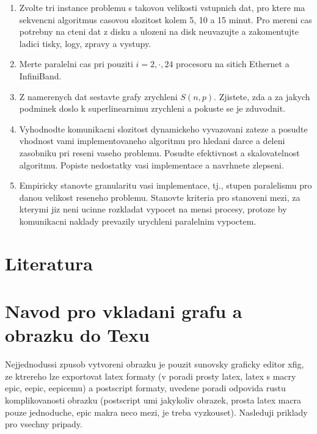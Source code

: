 \documentclass[a4paper]{article}
\begin{document}
\begin{enumerate}
\item Zvolte tri instance problemu s takovou velikosti vstupnich dat, pro ktere ma sekvencni 
algoritmus casovou slozitost kolem 5, 10 a 15 minut.
Pro mereni cas potrebny na cteni dat z disku a ulozeni na disk neuvazujte a zakomentujte
ladici tisky, logy, zpravy a vystupy.
\item Merte paralelni cas pri pouziti $i=2,\cdot,24$ procesoru na sitich Ethernet a InfiniBand.
\item Z namerenych dat sestavte grafy zrychleni $S(n,p)$. Zjistete, zda a za jakych podminek
doslo k superlinearnimu zrychleni a pokuste se je zduvodnit.
\item Vyhodnodte komunikacni slozitost dynamickeho vyvazovani zateze a posudte
vhodnost vami implementovaneho algoritmu pro hledani darce a deleni zasobniku pri reseni vaseho
problemu. Posudte efektivnost a skalovatelnost algoritmu. Popiste nedostatky
vasi implementace a navrhnete zlepseni.
\item Empiricky stanovte 
granularitu vasi implementace, tj., stupen paralelismu pro danou velikost reseneho
problemu. Stanovte kriteria pro stanoveni mezi, za kterymi jiz neni
ucinne rozkladat vypocet na mensi procesy, protoze by komunikacni
naklady prevazily urychleni paralelnim vypoctem.

\end{enumerate}

\section{Literatura}

\appendix

\section{Navod pro vkladani grafu a obrazku do Texu}

Nejjednodussi zpusob vytvoreni obrazku je pouzit sunovsky graficky editor xfig,
ze ktrereho lze exportovat latex formaty (v poradi prosty latex, 
latex s macry epic, eepic, eepicemu) a postscript formaty,
uvedene poradi odpovida rustu komplikovanosti obrazku
(postscript umi jakykoliv obrazek, prosta latex macra pouze jednoduche,
epic makra neco mezi, je treba vyzkouset). Nasleduji priklady
pro vsechny pripady. 
\end{document}
